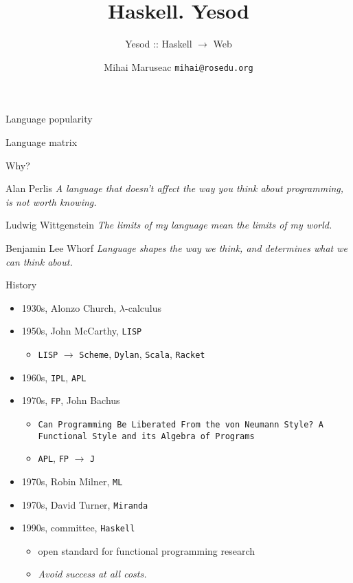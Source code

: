 \documentclass{beamer}
\title[Haskell-Yesod]{Haskell. Yesod}
\subtitle{Yesod :: Haskell $\rightarrow$ Web}
\institute[ROSEdu]{ROSEdu}
\author[MM]{Mihai Maruseac \texttt{mihai@rosedu.org}}
\begin{document}
\maketitle

\begin{frame}{Language popularity}
  \center
\end{frame}

\begin{frame}{Language matrix}
  \center
\end{frame}

\begin{frame}{Why?}
  \begin{block}{Alan Perlis}
   \textit{A language that doesn't affect the way you think about programming, is not
   worth knowing.}
  \end{block}
  \pause
  \begin{block}{Ludwig Wittgenstein}
   \textit{The limits of my language mean the limits of my world.}
  \end{block}
  \pause
  \begin{block}{Benjamin Lee Whorf}
   \textit{Language shapes the way we think, and determines what we can think
   about.}
  \end{block}
\end{frame}

\begin{frame}{History}
  \begin{itemize}[<+->]
    \item 1930s, Alonzo Church, $\lambda$-calculus
    \item 1950s, John McCarthy, \texttt{LISP}
    \begin{itemize}
      \item \texttt{LISP} $\rightarrow$ \texttt{Scheme}, \texttt{Dylan},
      \texttt{Scala}, \texttt{Racket}
    \end{itemize}
    \item 1960s, \texttt{IPL}, \texttt{APL}
    \item 1970s, \texttt{FP}, John Bachus
    \begin{itemize}
      \item \texttt{Can Programming Be Liberated From the von Neumann Style? A
      Functional Style and its Algebra of Programs}
      \item \texttt{APL}, \texttt{FP} $\rightarrow$ \texttt{J}
    \end{itemize}
    \item 1970s, Robin Milner, \texttt{ML}
    \item 1970s, David Turner, \texttt{Miranda}
    \item 1990s, committee, \texttt{Haskell}
    \begin{itemize}
      \item open standard for functional programming research
      \item \textit{Avoid success at all costs.}
    \end{itemize}
  \end{itemize}
\end{frame}
\end{document}
